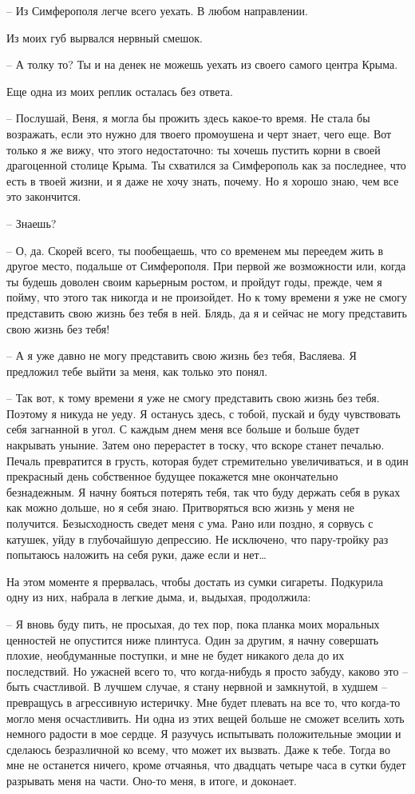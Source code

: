 \documentclass[
]{book}
\begin{document}
-- Из Симферополя легче всего уехать. В любом направлении.

Из моих губ вырвался нервный смешок.

-- А толку то? Ты и на денек не можешь уехать из своего самого центра Крыма.

Еще одна из моих реплик осталась без ответа.

-- Послушай, Веня, я могла бы прожить здесь какое-то время. Не стала бы возражать, если это нужно для твоего промоушена и черт знает, чего еще. Вот только я же вижу, что этого недостаточно: ты хочешь пустить корни в своей драгоценной столице Крыма. Ты схватился за Симферополь как за последнее, что есть в твоей жизни, и я даже не хочу знать, почему. Но я хорошо знаю, чем все это закончится.

-- Знаешь?

-- О, да. Скорей всего, ты пообещаешь, что со временем мы переедем жить в другое место, подальше от Симферополя. При первой же возможности или, когда ты будешь доволен своим карьерным ростом, и пройдут годы, прежде, чем я пойму, что этого так никогда и не произойдет. Но к тому времени я уже не смогу представить свою жизнь без тебя в ней. Блядь, да я и сейчас не могу представить свою жизнь без тебя!

-- А я уже давно не могу представить свою жизнь без тебя, Васляева. Я предложил тебе выйти за меня, как только это понял.

-- Так вот, к тому времени я уже не смогу представить свою жизнь без тебя. Поэтому я никуда не уеду. Я останусь здесь, с тобой, пускай и буду чувствовать себя загнанной в угол. С каждым днем меня все больше и больше будет накрывать уныние. Затем оно перерастет в тоску, что вскоре станет печалью. Печаль превратится в грусть, которая будет стремительно увеличиваться, и в один прекрасный день собственное будущее покажется мне окончательно безнадежным. Я начну бояться потерять тебя, так что буду держать себя в руках как можно дольше, но я себя знаю. Притворяться всю жизнь у меня не получится. Безысходность сведет меня с ума. Рано или поздно, я сорвусь с катушек, уйду в глубочайшую депрессию. Не исключено, что пару-тройку раз попытаюсь наложить на себя руки, даже если и нет\ldots{}

На этом моменте я прервалась, чтобы достать из сумки сигареты. Подкурила одну из них, набрала в легкие дыма, и, выдыхая, продолжила:

-- Я вновь буду пить, не просыхая, до тех пор, пока планка моих моральных ценностей не опустится ниже плинтуса. Один за другим, я начну совершать плохие, необдуманные поступки, и мне не будет никакого дела до их последствий. Но ужасней всего то, что когда-нибудь я просто забуду, каково это -- быть счастливой. В лучшем случае, я стану нервной и замкнутой, в худшем -- превращусь в агрессивную истеричку. Мне будет плевать на все то, что когда-то могло меня осчастливить. Ни одна из этих вещей больше не сможет вселить хоть немного радости в мое сердце. Я разучусь испытывать положительные эмоции и сделаюсь безразличной ко всему, что может их вызвать. Даже к тебе. Тогда во мне не останется ничего, кроме отчаянья, что двадцать четыре часа в сутки будет разрывать меня на части. Оно-то меня, в итоге, и доконает.
\end{document}
